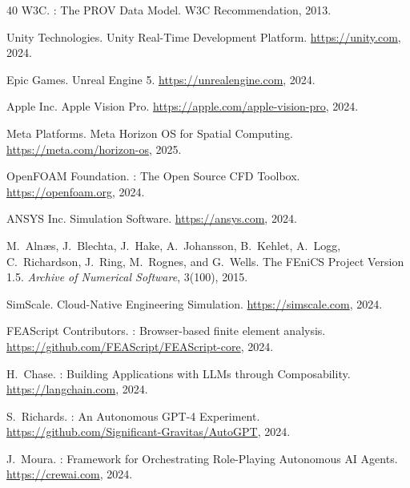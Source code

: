 \documentclass[sigchi-a]{acmart}
\begin{document}
\begin{thebibliography}{40}
{W3C}.
: The {PROV} Data Model.
\newblock W3C Recommendation, 2013.


Unity Technologies.
\newblock Unity Real-Time Development Platform.
\newblock \url{https://unity.com}, 2024.

Epic Games.
\newblock Unreal Engine 5.
\newblock \url{https://unrealengine.com}, 2024.

Apple Inc.
\newblock Apple Vision Pro.
\newblock \url{https://apple.com/apple-vision-pro}, 2024.

Meta Platforms.
\newblock Meta Horizon OS for Spatial Computing.
\newblock \url{https://meta.com/horizon-os}, 2025.


{OpenFOAM Foundation}.
: The Open Source {CFD} Toolbox.
\newblock \url{https://openfoam.org}, 2024.

{ANSYS Inc.}
 Simulation Software.
\newblock \url{https://ansys.com}, 2024.

M.~Aln{\ae}s, J.~Blechta, J.~Hake, A.~Johansson, B.~Kehlet, A.~Logg,
  C.~Richardson, J.~Ring, M.~Rognes, and G.~Wells.
\newblock The {FEniCS} Project Version 1.5.
\newblock \emph{Archive of Numerical Software}, 3(100), 2015.

SimScale.
\newblock Cloud-Native Engineering Simulation.
\newblock \url{https://simscale.com}, 2024.

{FEAScript Contributors}.
: Browser-based finite element analysis.
\newblock \url{https://github.com/FEAScript/FEAScript-core}, 2024.


H.~Chase.
: Building Applications with {LLM}s through Composability.
\newblock \url{https://langchain.com}, 2024.

S.~Richards.
: An Autonomous {GPT-4} Experiment.
\newblock \url{https://github.com/Significant-Gravitas/AutoGPT}, 2024.

J.~Moura.
: Framework for Orchestrating Role-Playing Autonomous
  {AI} Agents.
\newblock \url{https://crewai.com}, 2024.


\end{thebibliography}
\end{document}
